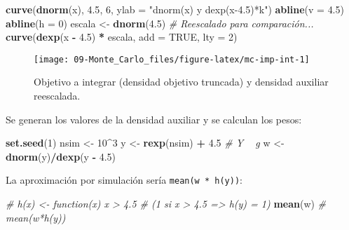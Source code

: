 \documentclass[
]{book}
\newenvironment{Shaded}{\begin{snugshade}}{\end{snugshade}}
\newcommand{\CommentTok}[1]{\textcolor[rgb]{0.56,0.35,0.01}{\textit{#1}}}
\newcommand{\DataTypeTok}[1]{\textcolor[rgb]{0.13,0.29,0.53}{#1}}
\newcommand{\DecValTok}[1]{\textcolor[rgb]{0.00,0.00,0.81}{#1}}
\newcommand{\FloatTok}[1]{\textcolor[rgb]{0.00,0.00,0.81}{#1}}
\newcommand{\KeywordTok}[1]{\textcolor[rgb]{0.13,0.29,0.53}{\textbf{#1}}}
\newcommand{\NormalTok}[1]{#1}
\newcommand{\OperatorTok}[1]{\textcolor[rgb]{0.81,0.36,0.00}{\textbf{#1}}}
\newcommand{\OtherTok}[1]{\textcolor[rgb]{0.56,0.35,0.01}{#1}}
\newcommand{\StringTok}[1]{\textcolor[rgb]{0.31,0.60,0.02}{#1}}
\theoremstyle{break}
\theoremstyle{definition}
\theoremstyle{definition}
\theoremstyle{definition}
\theoremstyle{remark}
\begin{document}
\begin{Shaded}
\begin{Highlighting}[]
\KeywordTok{curve}\NormalTok{(}\KeywordTok{dnorm}\NormalTok{(x), }\FloatTok{4.5}\NormalTok{, }\DecValTok{6}\NormalTok{, }\DataTypeTok{ylab =} \StringTok{"dnorm(x) y dexp(x-4.5)*k"}\NormalTok{)}
\KeywordTok{abline}\NormalTok{(}\DataTypeTok{v =} \FloatTok{4.5}\NormalTok{)}
\KeywordTok{abline}\NormalTok{(}\DataTypeTok{h =} \DecValTok{0}\NormalTok{)}
\NormalTok{escala <-}\StringTok{ }\KeywordTok{dnorm}\NormalTok{(}\FloatTok{4.5}\NormalTok{)  }\CommentTok{# Reescalado para comparación...}
\KeywordTok{curve}\NormalTok{(}\KeywordTok{dexp}\NormalTok{(x }\OperatorTok{-}\StringTok{ }\FloatTok{4.5}\NormalTok{) }\OperatorTok{*}\StringTok{ }\NormalTok{escala, }\DataTypeTok{add =} \OtherTok{TRUE}\NormalTok{, }\DataTypeTok{lty =} \DecValTok{2}\NormalTok{)  }
\end{Highlighting}
\end{Shaded}

\begin{figure}[!htb]

{\centering \texttt{[image: 09-Monte\_Carlo\_files/figure-latex/mc-imp-int-1]} 

}

\caption{Objetivo a integrar (densidad objetivo truncada) y densidad auxiliar reescalada.}\label{fig:mc-imp-int}
\end{figure}

Se generan los valores de la densidad auxiliar y se calculan los pesos:

\begin{Shaded}
\begin{Highlighting}[]
\KeywordTok{set.seed}\NormalTok{(}\DecValTok{1}\NormalTok{)}
\NormalTok{nsim <-}\StringTok{ }\DecValTok{10}\OperatorTok{^}\DecValTok{3}
\NormalTok{y <-}\StringTok{ }\KeywordTok{rexp}\NormalTok{(nsim) }\OperatorTok{+}\StringTok{ }\FloatTok{4.5}    \CommentTok{#  Y ~ g}
\NormalTok{w <-}\StringTok{ }\KeywordTok{dnorm}\NormalTok{(y)}\OperatorTok{/}\KeywordTok{dexp}\NormalTok{(y }\OperatorTok{-}\StringTok{ }\FloatTok{4.5}\NormalTok{)}
\end{Highlighting}
\end{Shaded}

La aproximación por simulación sería \texttt{mean(w\ *\ h(y))}:

\begin{Shaded}
\begin{Highlighting}[]
\CommentTok{# h(x) <- function(x) x > 4.5  # (1 si x > 4.5 => h(y) = 1)}
\KeywordTok{mean}\NormalTok{(w) }\CommentTok{# mean(w*h(y))}
\end{Highlighting}
\end{Shaded}
\end{document}
